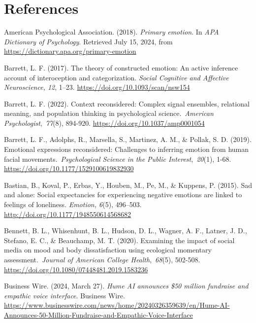\documentclass[authordate, reflection]{jote-new-article}
\begin{document}
	\section{References}



	American Psychological Association. (2018). \emph{Primary emotion}. In \emph{APA Dictionary of }\emph{Psychology}. Retrieved July 15, 2024, from \url{https://dictionary.apa.org/primary-emotion}



	Barrett, L. F. (2017). The theory of constructed emotion: An active inference account of interoception and categorization. \emph{Social Cognitive and Affective Neuroscience, 12}, 1--23. \url{https://doi.org/10.1093/scan/nsw154}



	Barrett, L. F. (2022). Context reconsidered: Complex signal ensembles, relational meaning, and population thinking in psychological science. \emph{American Psychologist}, \emph{77}(8), 894-920. \url{https://doi.org/10.1037/amp0001054}



	Barrett, L. F., Adolphs, R., Marsella, S., Martinez, A. M., \& Pollak, S. D. (2019). Emotional expressions reconsidered: Challenges to inferring emotion from human facial movements. \emph{Psychological Science in the Public Interest}, \emph{20}(1), 1-68. \url{https://doi.org/10.1177/1529100619832930}



	Bastian, B., Koval, P., Erbas, Y., Houben, M., Pe, M., \& Kuppens, P. (2015). Sad and alone: Social expectancies for experiencing negative emotions are linked to feelings of loneliness. \emph{Emotion, 6}(5), 496--503. \url{http://doi.org/10.1177/1948550614568682}



	Bennett, B. L., Whisenhunt, B. L., Hudson, D. L., Wagner, A. F., Latner, J. D., Stefano, E. C., \& Beauchamp, M. T. (2020). Examining the impact of social media on mood and body dissatisfaction using ecological momentary assessment. \emph{Journal of American College Health}, \emph{68}(5), 502-508. \url{https://doi.org/10.1080/07448481.2019.1583236}



	Business Wire. (2024, March 27). \emph{Hume AI announces \$50 million fundraise and empathic } \emph{voice interface}. Business Wire. \url{https://www.businesswire.com/news/home/20240326359639/en/Hume-AI-Announces-50-Million-Fundraise-and-Empathic-Voice-Interface}
\end{document}
